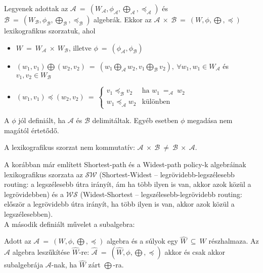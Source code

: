   \begin{definition} 
    Legyenek adottak az $\mathcal{A}~=~(W_{\mathcal{A}},\phi_{\mathcal{A}},\bigoplus_{\mathcal{A}}, \preceq_{\mathcal{A}})$ és\\ $\mathcal{B}~=~(W_{\mathcal{B}},\phi_{\mathcal{B}},\bigoplus_{\mathcal{B}},\preceq_{\mathcal{B}})$ algebrák. Ekkor az $\mathcal{A}~\times~\mathcal{B}~=~(W,\phi,\bigoplus,\preceq)$ lexikografikus szorzatuk, ahol
    \begin{itemize}
    \item $W~=~W_{\mathcal{A}}~\times~W_{\mathcal{B}}$, illetve $\phi ~=~ (\phi_{\mathcal{A}}, \phi_{\mathcal{B}})$
    \item $(w_{1},v_{1}) \bigoplus (w_{2},v_{2})~=~ (w_{1} \bigoplus_{\mathcal{A}} w_{2},v_{1} \bigoplus_{\mathcal{B}} v_{2}),~\forall w_{1},w_{1} \in W_{\mathcal{A}}$ és $v_{1}, v_{2} \in W_{\mathcal{B}}$
    \item $(w_{1},v_{1}) \preceq (w_{2}, v_{2})~=~
    \begin{cases}
      v_{1} \preceq_{\mathcal{B}} v_{2} & \text{ha } w_{1}~=_{\mathcal{A}}~w_{2} \\
      w_{1} \preceq_{\mathcal{A}} w_{2} & \text{különben}
    \end{cases}$
    \end{itemize}
  \end{definition}

  \begin{note}
    A $\phi$ jól definiált, ha $\mathcal{A}$ és $\mathcal{B}$ delimitáltak. Egyéb esetben $\phi$ megadása nem magától értetődő.
  \end{note}
  \begin{note}
    A lexikografikus szorzat nem kommutatív: $\mathcal{A}~\times~\mathcal{B}~\neq~\mathcal{B}~\times~\mathcal{A}$.
  \end{note}

  A korábban már említett Shortest-path és a Widest-path policy-k algebráinak lexikografikus szorzata az $\mathcal{SW}$ (Shortest-Widest -- legrövidebb-legszélesebb routing: a legszélesebb útra irányít, ám ha több ilyen is van, akkor azok közül a legrövidebben) és a $\mathcal{WS}$ (Widest-Shortest -- legszélesebb-legrövidebb routing: először a legrövidebb útra irányít, ha több ilyen is van, akkor azok közül a legszélesebben).\\

  A második definiált művelet a subalgebra:
  \begin{definition} 
    Adott az $\mathcal{A}~=~(W,\phi,\bigoplus,\preceq)$ algebra és a súlyok egy $\hat{W}~\subseteq~W$ részhalmaza. Az $\mathcal{A}$ algebra leszűkítése $\hat{W}$-re: $\hat{\mathcal{A}}~=~(\hat{W},\phi,\bigoplus,\preceq)$ akkor és csak akkor subalgebrája $\mathcal{A}$-nak, ha $\hat{W}$ zárt $\bigoplus$-ra.
  \end{definition}

